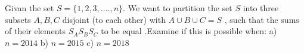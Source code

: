 Givan the set $S = \{1,2,3,....,n\}$. We want to partition the set  $S$ into three subsets $A,B,C$ disjoint (to each other) with $A\cup B\cup C=S$ , such that the sums of their elements  $S_{A} S_{B} S_{C}$ to be equal .Examine if this is possible when:
a) $n=2014$
b) $n=2015 $
c) $n=2018$